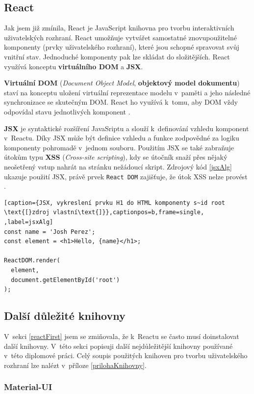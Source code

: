 \subsection{React}

Jak jsem již zmínila, React je JavaScript knihovna pro tvorbu interaktivních uživatelských rozhraní. React umožňuje vytvářet samostatné znovupoužitelné komponenty (prvky uživatelského rozhraní), které jsou schopné spravovat svůj vnitřní stav. Jednoduché komponenty pak lze skládat do složitějších. React využívá konceptu \textbf{virtuálního DOM} a \textbf{JSX}. 

\textbf{Virtuální DOM} (\textit{Document Object Model}, \textbf{objektový model dokumentu}) staví na konceptu uložení virtuální reprezentace modelu v~paměti a jeho následné synchronizace se skutečným DOM. React ho využívá k~tomu, aby DOM vždy odpovídal stavu jednotlivých komponent \cite{VDOM}.

\textbf{JSX} je syntaktické rozšíření JavaSriptu a slouží k~definování vzhledu komponent v~Reactu. Díky JSX může být definice vzhledu a funkce zodpovědné za logiku komponenty pohromadě v~jednom souboru. Použitím JSX se také zabraňuje útokům typu \textbf{XSS} (\textit{Cross-site scripting}), kdy se útočník snaží přes nějaký neošetřený vstup nahrát na stránku nežádoucí skript. Zdrojový kód \ref{jsxAlg} ukazuje použití JSX, právě prvek \texttt{React DOM} zajišťuje, že útok XSS nelze provést \cite{JSX}.

\begin{lstlisting}[caption={JSX, vykreslení prvku H1 do HTML komponenty s~id root \text{[}zdroj vlastní\text{]}},captionpos=b,frame=single, ,label=jsxAlg]
const name = 'Josh Perez';
const element = <h1>Hello, {name}</h1>;

ReactDOM.render(
  element,
  document.getElementById('root')
);
\end{lstlisting}

\subsection{Další důležité knihovny}

V~sekci \ref{reactFirst} jsem se zmiňovala, že k~Reactu se často musí doinstalovat další knihovny. V~této sekci popisuji další nejdůležitější knihovny používané v~této diplomové práci. Celý soupis použitých knihoven pro tvorbu uživatelského rozhraní lze nalézt v~příloze \ref{prilohaKnihovny}.

\subsubsection *{Material-UI}


